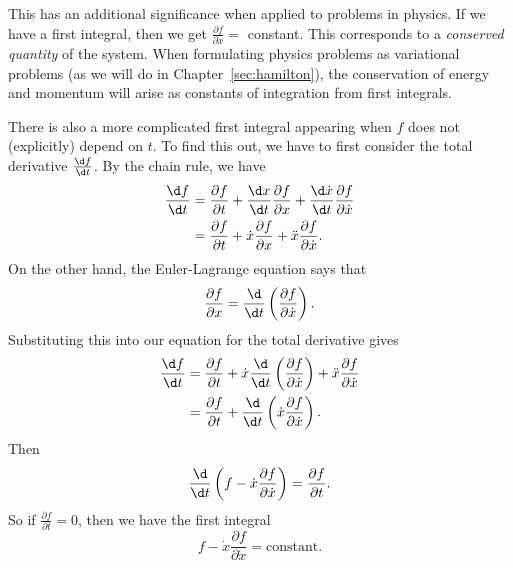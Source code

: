 \documentclass[a4paper]{article}
\begin{document}
This has an additional significance when applied to problems in physics. If we have a first integral, then we get $\frac{\partial f}{\partial \dot{x}} =$ constant. This corresponds to a \emph{conserved quantity} of the system. When formulating physics problems as variational problems (as we will do in Chapter~\ref{sec:hamilton}), the conservation of energy and momentum will arise as constants of integration from first integrals.

There is also a more complicated first integral appearing when $f$ does not (explicitly) depend on $t$. To find this out, we have to first consider the total derivative $\frac{\d f}{\d t}$. By the chain rule, we have
\begin{align*}
  \frac{\d f}{\d t} &= \frac{\partial f}{\partial t} + \frac{\d x}{\d t}\frac{\partial f}{\partial x} + \frac{\d \dot{x}}{\d t}\frac{\partial f}{\partial \dot{x}} \\
  &= \frac{\partial f}{\partial t} + \dot{x}\frac{\partial f}{\partial x} + \ddot{x} \frac{\partial f}{\partial \dot{x}}.
\end{align*}
On the other hand, the Euler-Lagrange equation says that
\[
  \frac{\partial f}{\partial x} = \frac{\d}{\d t} \left(\frac{\partial f}{\partial \dot{x}}\right).
\]
Substituting this into our equation for the total derivative gives
\begin{align*}
  \frac{\d f}{\d t} &= \frac{\partial f}{\partial t} + \dot{x} \frac{\d}{\d t}\left(\frac{\partial f}{\partial \dot{x}}\right) + \ddot{x}\frac{\partial f}{\partial \dot{x}}\\
  &= \frac{\partial f}{\partial t} + \frac{\d}{\d t}\left(\dot{x}\frac{\partial f}{\partial \dot{x}}\right).
\end{align*}
Then
\[
  \frac{\d}{\d t}\left(f - \dot{x}\frac{\partial f}{\partial \dot{x}}\right) = \frac{\partial f}{\partial t}.
\]
So if $\frac{\partial f}{\partial t} = 0$, then we have the first integral
\[
  f - \dot{x}\frac{\partial f}{\partial \dot{x}} = \text{constant}.
\]
\end{document}
